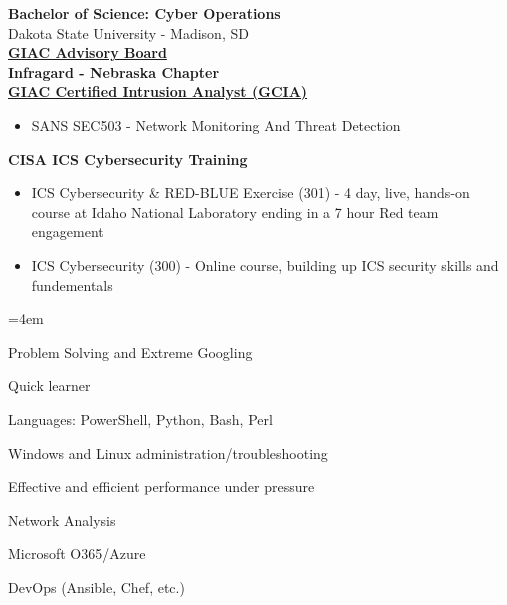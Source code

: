 \documentclass[a4paper,10pt]{article}
\begin{document}
\textbf{Bachelor of Science: Cyber Operations} \\
Dakota State University - Madison, SD \\
\href{https://www.credly.com/badges/a65cec63-e07c-4e52-b154-842564aadf65/public_url}{\textbf{GIAC Advisory Board}} \\
\textbf{Infragard - Nebraska Chapter} \\
\href{https://www.credly.com/badges/87563fff-910c-449c-ab21-f571b162cd4b/public_url}{\textbf{GIAC Certified Intrusion Analyst (GCIA)}}
\begin{itemize}
    \small
    \leftskip=4em
    \item SANS SEC503 - Network Monitoring And Threat Detection
\end{itemize}
\textbf{CISA ICS Cybersecurity Training}
\begin{itemize}
    \small
    \leftskip=4em
    \item ICS Cybersecurity \& RED-BLUE Exercise (301) - 4 day, live, hands-on course at Idaho National Laboratory ending in a 7 hour Red team engagement 
    \item ICS Cybersecurity (300) - Online course, building up ICS security skills and fundementals
\end{itemize}
\begin{itemize}
    \begin{multicols}{2}
    \small
    \leftskip=4em
    \item Problem Solving and Extreme Googling
    \item Quick learner
    \item Languages: PowerShell, Python, Bash, Perl
    \item Windows and Linux administration/troubleshooting
    \item Effective and efficient performance under pressure
    \item Network Analysis
    \item Microsoft O365/Azure
    \item DevOps (Ansible, Chef, etc.)
    \end{multicols}
\end{itemize}
\end{document}
